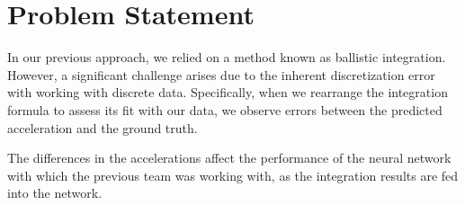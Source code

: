 \section{Problem Statement}
In our previous approach, we relied on a method known as ballistic integration. 
However, a significant challenge arises due to the inherent discretization error with working with discrete data.
Specifically, when we rearrange the integration formula to assess its fit with our data, 
we observe errors between the predicted acceleration and the ground truth.

The differences in the accelerations affect the performance of the neural network with which the previous team was working with, 
as the integration results are fed into the network.

